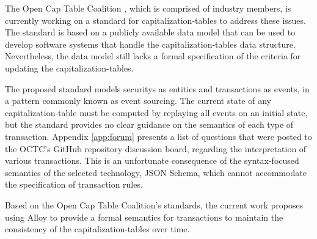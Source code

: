 The Open Cap Table Coalition \cite{octc}, which is comprised of industry members, is currently working on a standard for \glspl{capitalization-table} to address these issues.
%
The standard is based on a publicly available data model that can be used to develop software systems that handle the \glspl{capitalization-table} data structure. Nevertheless, the data model still lacks a formal specification of the criteria for updating the \glspl{capitalization-table}. 

The proposed standard models \glspl{security} as entities and \glspl{transaction} as events, in a pattern commonly known as event sourcing\cite{evans2004ddd}. The current state of any \gls{capitalization-table} must be computed by replaying all events on an initial state, but the standard provides no clear guidance on the semantics of each type of transaction. Appendix \ref{app:forum} presents a list of questions that were posted to the OCTC's GitHub repository discussion board, regarding the interpretation of various transactions.
%
This is an unfortunate consequence of the syntax-focused semantics of the selected technology, JSON Schema, which cannot accommodate the specification of transaction rules.

Based on the Open Cap Table Coalition's \cite{octc} standards, the current work proposes using Alloy \cite{jackson-2002} to provide a formal semantics for transactions to maintain the consistency of the \glspl{capitalization-table} over time. 

